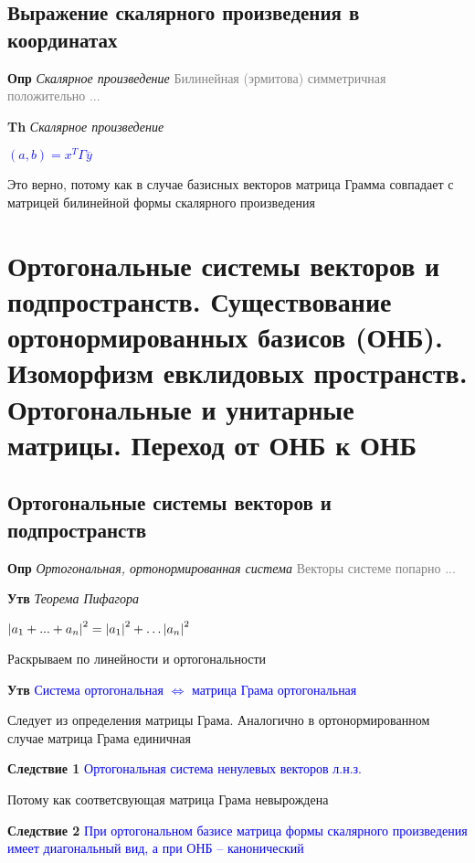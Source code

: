 \documentclass[a4paper, 14pt]{article}
\begin{document}
    \subsection{Выражение скалярного произведения в координатах}
    
    \textbf{Опр} \textit{Скалярное произведение} \textcolor{gray}{Билинейная (эрмитова) симметричная положительно ...}
    
    \textbf{Th} \textit{Скалярное произведение}
    
    \textcolor{blue}{$(a, b) = x^T \Gamma \overline{y}$}
    
    Это верно, потому как в случае базисных векторов матрица Грамма совпадает с матрицей билинейной формы скалярного
    произведения
    
    \section{Ортогональные системы векторов и подпространств.
    Существование ортонормированных базисов (ОНБ).
    Изоморфизм евклидовых пространств.
    Ортогональные и унитарные матрицы.
    Переход от ОНБ к ОНБ}
    
    \subsection{Ортогональные системы векторов и подпространств}
    
    \textbf{Опр} \textit{Ортогональная, ортонормированная система} \textcolor{gray}{Векторы системе попарно ...}
    
    \textbf{Утв} \textit{Теорема Пифагора}
    
    \textcolor{blue}{$\abs{a_1 + ... + a_n}^2 = \abs{a_1}^2 + \dots \abs{a_n}^2$}
    
    Раскрываем по линейности и ортогональности
    
    \textbf{Утв} \textcolor{blue}{Система ортогональная $\Leftrightarrow$ матрица Грама ортогональная}
    
    Следует из определения матрицы Грама.
    Аналогично в ортонормированном случае матрица Грама единичная
    
    \textbf{Следствие 1} \textcolor{blue}{Ортогональная система ненулевых векторов л.н.з.}
    
    Потому как соответсвующая матрица Грама невырождена
    
    \textbf{Следствие 2} \textcolor{blue}{При ортогональном базисе матрица формы скалярного произведения имеет
    диагональный вид, а при ОНБ -- канонический}
    
\end{document}
